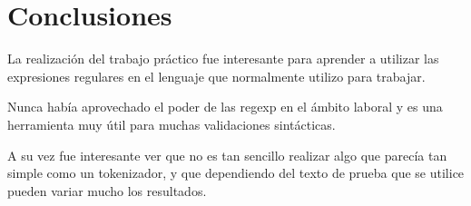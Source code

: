 \section{Conclusiones}

La realizaci\'on del trabajo pr\'actico fue interesante para aprender a utilizar las expresiones regulares en el lenguaje que normalmente utilizo para trabajar.

Nunca hab\'ia aprovechado el poder de las regexp en el \'ambito laboral y es una herramienta muy \'util para muchas validaciones sint\'acticas. 

A su vez fue interesante ver que no es tan sencillo realizar algo que parec\'ia tan simple como un tokenizador, y que dependiendo del texto de prueba que se utilice pueden variar mucho los resultados. 